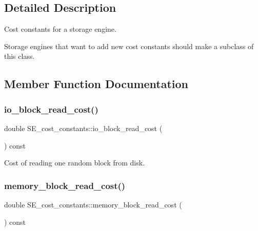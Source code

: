 \subsection{Detailed Description}
Cost constants for a storage engine.

Storage engines that want to add new cost constants should make a subclass of this class. 

\subsection{Member Function Documentation}
\mbox{\label{classSE__cost__constants_af2d93f7ee2b5641b14d359bedf9ab0cf}} 
\subsubsection{\texorpdfstring{io\+\_\+block\+\_\+read\+\_\+cost()}{io\_block\_read\_cost()}}
{\footnotesize\ttfamily double S\+E\+\_\+cost\+\_\+constants\+::io\+\_\+block\+\_\+read\+\_\+cost (\begin{DoxyParamCaption}{ }\end{DoxyParamCaption}) const\hspace{0.3cm}{\ttfamily [inline]}}

Cost of reading one random block from disk. \mbox{\label{classSE__cost__constants_a9c48a1d96a3876f417264945ed026627}} 
\subsubsection{\texorpdfstring{memory\+\_\+block\+\_\+read\+\_\+cost()}{memory\_block\_read\_cost()}}
{\footnotesize\ttfamily double S\+E\+\_\+cost\+\_\+constants\+::memory\+\_\+block\+\_\+read\+\_\+cost (\begin{DoxyParamCaption}{ }\end{DoxyParamCaption}) const\hspace{0.3cm}{\ttfamily [inline]}}

